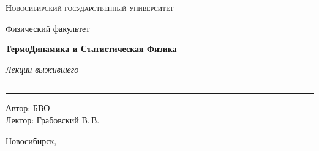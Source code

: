 \documentclass[12pt,a4paper]{report}
\begin{document}
\begin{titlepage}
    \thispagestyle{empty}

    \begin{center}
        \vspace*{1.5cm}

        {\Large\scshape Новосибирский государственный университет\par}
        \vspace{0.25cm}
        {\large Физический факультет\par}

        \vfill

        {\Huge\bfseries ТермоДинамика и Статистическая Физика\par}

        \vspace{0.45cm}

        {\Large\itshape Лекции выжившего\par}

        \vspace{0.8cm}

        \rule{0.72\linewidth}{0 pt}



        \rule{2\linewidth}{0pt}

        \vfill

        \begin{flushright}
            \large
            Автор: БВО\\[0.25cm]
            Лектор: Грабовский В.\,В.
        \end{flushright}

        \vspace{1.2cm}

        {\large Новосибирск, \the\year}

    \end{center}
\end{titlepage}

\tableofcontents
\newpage



\clearpage
\end{document}
